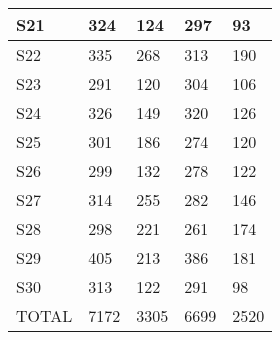 \begin{table}[H]
\begin{tabular}{|l|l|l|l|l|}
S21 & 324 & 124 & 297 & 93 \\ \hline
S22 & 335 & 268 & 313 & 190 \\ \hline
S23 & 291 & 120 & 304 & 106 \\ \hline
S24 & 326 & 149 & 320 & 126 \\ \hline
S25 & 301 & 186 & 274 & 120 \\ \hline
S26 & 299 & 132 & 278 & 122 \\ \hline
S27 & 314 & 255 & 282 & 146 \\ \hline
S28 & 298 & 221 & 261 & 174 \\ \hline
S29 & 405 & 213 & 386 & 181 \\ \hline
S30 & 313 & 122 & 291 & 98 \\ \hline
TOTAL & 7172 & 3305 & 6699 & 2520 \\ \hline
\end{tabular}
\label{tab:all}
\end{table}

